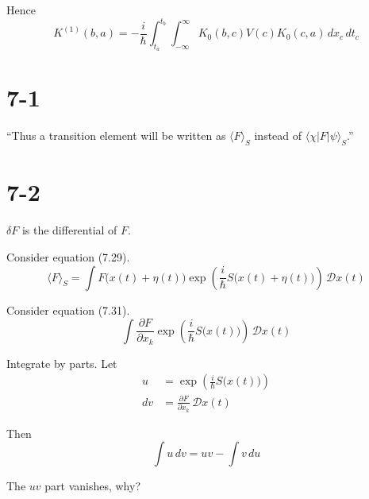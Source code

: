 \documentclass[12pt]{article}
\begin{document}
Hence
\begin{equation*}
K^{(1)}(b,a)=-\frac{i}{\hbar}
\int_{t_a}^{t_b}
\int_{-\infty}^{\infty}
K_0(b,c)V(c)K_0(c,a)
\,dx_c\,dt_c
\end{equation*}

\section*{7-1}

``Thus a transition element will be written as $\langle F\rangle_S$
instead of $\langle\chi|F|\psi\rangle_S$.''

\section*{7-2}

$\delta F$ is the differential of $F$.

\bigskip
Consider equation (7.29).
\begin{equation*}
\langle F\rangle_S=\int F\big(x(t)+\eta(t)\big)
\exp\left(\frac{i}{\hbar}S\big(x(t)+\eta(t)\big)\right)
\,\mathcal Dx(t)
\end{equation*}

Consider equation (7.31).
\begin{equation*}
\int\frac{\partial F}{\partial x_k}\exp\left(\frac{i}{\hbar}S\big(x(t)\big)\right)\,\mathcal Dx(t)
\tag{7.31}
\end{equation*}

Integrate by parts. Let
\begin{align*}
u&=\exp\left(\frac{i}{\hbar}S\big(x(t)\big)\right)
\\
dv&=\frac{\partial F}{\partial x_k}\,\mathcal Dx(t)
\end{align*}

Then
\begin{equation*}
\int u\,dv=uv-\int v\,du
\end{equation*}

The $uv$ part vanishes, why?
\end{document}
